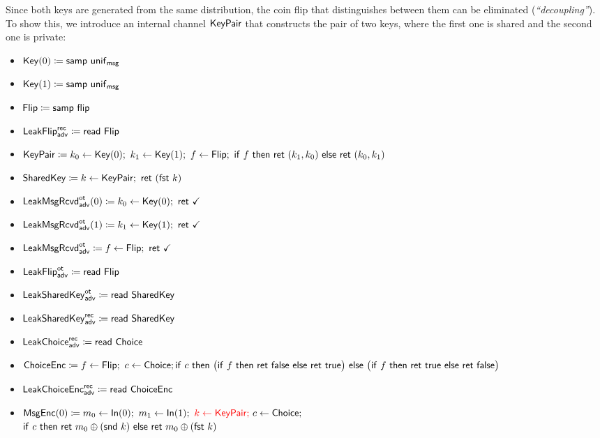 \noindent Since both keys are generated from the same distribution, the coin flip that distinguishes between them can be eliminated (\emph{``decoupling''}). To show this, we introduce an internal channel $\mathsf{KeyPair}$ that constructs the pair of two keys, where the first one is shared and the second one is private:

\begin{itemize}
\item $\mathsf{Key}(0) \coloneqq \mathsf{samp} \ \mathsf{unif}_{\mathsf{msg}}$
\item $\mathsf{Key}(1) \coloneqq \mathsf{samp} \ \mathsf{unif}_{\mathsf{msg}}$
\item $\mathsf{Flip} \coloneqq \mathsf{samp} \ \mathsf{flip}$
\item {\color{blue} $\mathsf{LeakFlip}^{\mathsf{rec}}_{\mathsf{adv}} \coloneqq \mathsf{read} \ \mathsf{Flip}$}
\item {\color{red} $\KeyPair \coloneqq k_0 \leftarrow \Key(0); \ k_1 \leftarrow \Key(1); \ f \leftarrow \Flip; \ \ifte{f}{\ret{(k_1,k_0)}}{\ret{(k_0,k_1)}}$}
\item {\color{red} $\mathsf{SharedKey} \coloneqq k \leftarrow \mathsf{KeyPair}; \ \mathsf{ret} \ (\mathsf{fst} \ k)$}
\item {\color{blue} $\LeakKeyRcvd^\ot_\adv(0) \coloneqq k_0 \leftarrow \Key(0); \ \ret{\checkmark}$}
\item {\color{blue} $\LeakKeyRcvd^\ot_\adv(1) \coloneqq k_1 \leftarrow \Key(1); \ \ret{\checkmark}$}
\item {\color{blue} $\mathsf{LeakMsgRcvd}^{\mathsf{ot}}_{\mathsf{adv}} \coloneqq f \leftarrow \mathsf{Flip}; \ \mathsf{ret} \ \checkmark$}
\item {\color{blue} $\mathsf{LeakFlip}^{\mathsf{ot}}_{\mathsf{adv}} \coloneqq \mathsf{read} \ \mathsf{Flip}$}
\item {\color{blue} $\mathsf{LeakSharedKey}^{\mathsf{ot}}_{\mathsf{adv}} \coloneqq \mathsf{read} \ \mathsf{SharedKey}$}
\item {\color{blue} $\mathsf{LeakSharedKey}^{\mathsf{rec}}_{\mathsf{adv}} \coloneqq \mathsf{read} \ \mathsf{SharedKey}$}
\item {\color{blue} $\mathsf{LeakChoice}^{\mathsf{rec}}_{\mathsf{adv}} \coloneqq \mathsf{read} \ \mathsf{Choice}$}
\item $\mathsf{ChoiceEnc} \coloneqq f \leftarrow \mathsf{Flip}; \ c \leftarrow \mathsf{Choice}; \\ \mathsf{if} \ c \ \mathsf{then} \ \big(\mathsf{if} \ f \ \mathsf{then} \ \mathsf{ret} \ \mathsf{false} \ \mathsf{else} \ \mathsf{ret} \ \mathsf{true}\big) \ \mathsf{else} \ \big(\mathsf{if} \ f \ \mathsf{then} \ \mathsf{ret} \ \mathsf{true} \ \mathsf{else} \ \mathsf{ret} \ \mathsf{false}\big)$
\item {\color{blue} $\mathsf{LeakChoiceEnc}^{\mathsf{rec}}_{\mathsf{adv}} \coloneqq \mathsf{read} \ \mathsf{ChoiceEnc}$}
\item $\mathsf{MsgEnc}(0) \coloneqq m_0 \leftarrow \mathsf{In}(0); \ m_1 \leftarrow \mathsf{In}(1); \ {\color{red} k \leftarrow \mathsf{KeyPair};} \ c \leftarrow \mathsf{Choice};$ \\ {\color{red} $\ifte{c}{\ret{m_0 \oplus (\snd \ k)}}{\ret{m_0 \oplus (\fst \ k)}}$}

\end{itemize}
